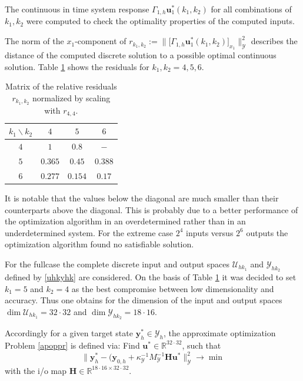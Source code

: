 \documentclass[a4paper,10pt,BCOR=15mm]{scrbook}
\providecommand{\norm}[1]{\lVert#1 \rVert}
\begin{document}
The continuous in time system response $\Gamma_{1,h} \mathbf u^*_{1}(k_1,k_2)$ for all combinations of $k_1,k_2$ were computed to check the optimality properties of the computed inputs. 

The norm of the $x_1$-component of  $r_{k_1,k_2} := \norm{\bigl [\Gamma_{1,h} \mathbf u^*_{1}(k_1,k_2)\bigr ]_{x_1}}_{\mathcal Y}^2$ describes the distance of the computed discrete solution to a possible optimal continuous solution. Table \ref{rema} shows the residuals for $k_1,k_2 = 4,5,6$. 

\begin{table}[htbp]
\centering
\begin{tabular}{c|ccc}
$k_1 \backslash k_2$ & $4$ & $5$ & $6$ \\ 
\hline
$4  $& $1$ &$0.8 $&$ - $\\ 
$5  $&$0.365$ &$0.45  $&$  0.388 $\\
$6 $& $0.277$&$  0.154$&$   0.17  $ \\

\end{tabular}
\caption{Matrix of the relative residuals $r_{k_1,k_2}$ normalized by scaling with $r_{4,4}$.}
\label{rema}
\end{table}

It is notable that the values below the diagonal are much smaller than their counterparts above the diagonal. This is probably due to a better performance of the optimization algorithm in an overdetermined rather than in an underdetermined system. For the extreme case $2^4$ inputs versus $2^6$ outputs the optimization algorithm found no satisfiable solution.

For the fullcase the complete discrete input and output spaces $\mathcal U_{hk_1}$ and $\mathcal Y_{hk_2}$ defined by \eqref{uhkyhk} are considered. On the basis of Table \ref{rema} it was decided to set $k_1=5$ and $k_2=4$ as the best compromise between low dimensionality and accuracy. Thus one obtains for the dimension of the input and output spaces  $\dim \mathcal U_{hk_1}=32\cdot 32$ and $\dim \mathcal Y_{hk_2} = 18 \cdot 16$. 

Accordingly for a given target state $\mathbf y_h^* \in \mathcal Y_h $, the approximate optimization Problem \ref{apoppr} is defined via: Find $\mathbf u^* \in \mathbb R ^{32 \cdot 32}$, such that
\begin{equation*}
 \norm{\mathbf y_h^* - (\mathbf y_{0,h} + \kappa_{\mathcal Y}^{-1} M_{\mathcal Y}^{-1} \mathbf H\mathbf u^* }^2_{\mathcal Y} \rightarrow \min
\end{equation*}
with the i/o map $\mathbf H \in \mathbb R ^{18 \cdot 16 \times 32 \cdot 3 2}$.
\end{document}
